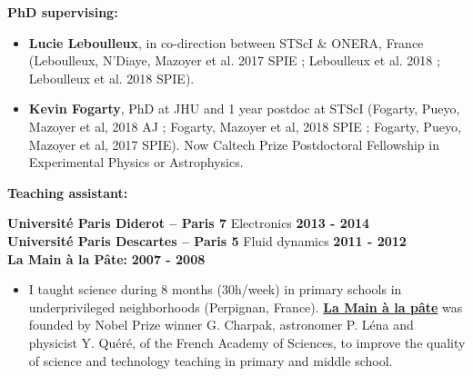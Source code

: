 \documentclass[12pt]{article}
\begin{document}
\textbf{PhD supervising:}\\
\begin{itemize}
    \item \small  \textbf{Lucie Leboulleux}, in co-direction between STScI \& ONERA, France (Leboulleux, N'Diaye, Mazoyer  et al. 2017 SPIE ; Leboulleux et al. 2018 ;  Leboulleux et al. 2018 SPIE).
    \item \textbf{Kevin Fogarty}, PhD at JHU and 1 year postdoc at STScI (Fogarty, Pueyo, Mazoyer et al, 2018 AJ ; Fogarty, Mazoyer et al, 2018 SPIE ; Fogarty, Pueyo, Mazoyer et al, 2017 SPIE). Now Caltech Prize Postdoctoral Fellowship in Experimental Physics or Astrophysics.
\end{itemize}

\textbf{Teaching assistant:}\\
\vspace{-0.2cm}

\textbf{Universit\'e Paris Diderot -- Paris 7} \hspace{1.85cm} {\small Electronics} \hfill \textbf{2013 - 2014}\\
\textbf{Universit\'e Paris Descartes -- Paris 5} \hspace{1.5cm} {\small Fluid dynamics} \hfill \textbf{2011 - 2012}\\

\textbf{La Main à la Pâte:} \hfill \textbf{2007 - 2008}
\begin{itemize}
    \item {\small I taught science during 8 months (30h/week) in primary schools in underprivileged neighborhoods (Perpignan, France). \href{https://www.fondation-lamap.org/en/international}{\textbf{La Main à la pâte}} was  founded by Nobel Prize winner G. Charpak, astronomer P. Léna and physicist Y. Quéré, of the French Academy of Sciences, to improve the quality of science and technology teaching in primary and middle school.}
\end{itemize}




\end{document}
